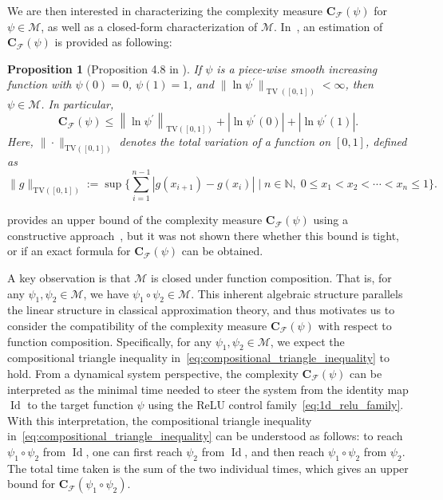 \documentclass[12pt]{amsart}
\numberwithin{equation}{section}
\newtheorem{proposition}{Proposition}[section]
\theoremstyle{remark}
\newcommand{\ql}[1]{\texttt{\color{cyan} QL: \footnotesize #1}}
\begin{document}
We are then interested in characterizing the complexity measure $\mathbf C_{\mathcal F}(\psi)$ for $\psi\in \mathcal M$, as well as a closed-form characterization of $\mathcal M$. In~\cite{li2022deep}, an estimation of $\mathbf{C}_{\mathcal F}(\psi)$ is provided as following:
\begin{proposition}[Proposition 4.8 in \cite{li2022deep}]
    \label{thm:1D_relu}
    If $\psi$ is a piece-wise smooth increasing function with $\psi(0)=0$, $\psi(1)=1$, and $\|\ln \psi^\prime\|_{\operatorname{TV}([0,1])}<\infty$, then $\psi \in \mathcal M$. In particular,
    \begin{equation}
    \mathbf{C}_{\mathcal F}(\psi) \le \left\|\ln \psi^{\prime}\right\|_{\mathrm{TV}([0,1])}+ |\ln \psi^\prime(0)|+|\ln \psi^\prime(1)|.
    \end{equation}
Here, $\|\cdot\|_{\mathrm{TV}([0,1])}$ denotes the total variation of a function on $[0,1]$, defined as
\begin{equation}
    \|g\|_{\mathrm{TV}([0,1])} := \sup \{\sum_{i=1}^{n-1} |g(x_{i+1}) - g(x_i)| \;\Big| \; n\in \mathbb N,\; 0\le x_1 < x_2 < \cdots < x_n \le 1\}.
\end{equation}
\end{proposition}

 provides an upper bound of the complexity measure $\mathbf C_{\mathcal F}(\psi)$ using a constructive approach~\cite{li2022deep},
but it was not shown there whether this bound is tight, or if an exact
formula for $\mathbf C_{\mathcal F}(\psi)$ can be obtained.

A key observation is that $\mathcal M$ is closed under function composition.
That is, for any $\psi_1, \psi_2 \in \mathcal M$, we have $\psi_1 \circ \psi_2 \in \mathcal M$.
This inherent algebraic structure parallels
the linear structure in classical approximation theory, and thus motivates us to consider the compatibility of the complexity measure $\mathbf C_{\mathcal F}(\psi)$ with respect to function composition. Specifically, for any $\psi_1, \psi_2 \in \mathcal M$, we expect the compositional triangle inequality in~\eqref{eq:compositional_triangle_inequality} to hold.
From a dynamical system perspective, the complexity $\mathbf C_{\mathcal F}(\psi)$ can be interpreted as the minimal time needed to steer the system from the identity map $\operatorname{Id}$ to the target function $\psi$ using the ReLU control family~\eqref{eq:1d_relu_family}. With this interpretation, the compositional triangle inequality in~\eqref{eq:compositional_triangle_inequality} can be understood as follows: to reach $\psi_1 \circ \psi_2$ from $\operatorname{Id}$, one can first reach $\psi_2$ from $\operatorname{Id}$, and then reach $\psi_1 \circ \psi_2$ from $\psi_2$. The total time taken is the sum of the two individual times, which gives an upper bound for $\mathbf C_{\mathcal F}(\psi_1 \circ \psi_2)$.
\end{document}
